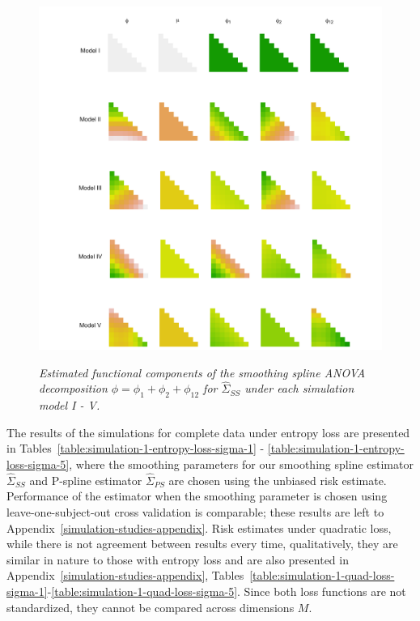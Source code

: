 \begin{figure}[H] 
\caption{\textit{Estimated functional components of the smoothing spline ANOVA decomposition $\phi = \phi_1 + \phi_2 + \phi_{12}$ for $\hat{\Sigma}_{SS}$ under each simulation model I - V.}}
  \includegraphics[width = \textwidth]{img/chapter-4/ssanova-estimate-lattice} \label{fig:ssanova-component-lattice}
\end{figure}

\bigskip
The results of the simulations for complete data under entropy loss are presented in Tables~\ref{table:simulation-1-entropy-loss-sigma-1} - \ref{table:simulation-1-entropy-loss-sigma-5}, where the smoothing parameters for our smoothing spline estimator $\hat{\Sigma}_{SS}$ and P-spline estimator $\hat{\Sigma}_{PS}$ are chosen using the unbiased risk estimate. Performance of the estimator when the smoothing parameter is chosen using leave-one-subject-out cross validation is comparable; these results are left to Appendix~\ref{simulation-studies-appendix}. Risk estimates under quadratic loss, while there is not agreement between results every time, qualitatively, they are similar in nature to those with entropy loss and are also presented in Appendix~\ref{simulation-studies-appendix}, Tables~\ref{table:simulation-1-quad-loss-sigma-1}-\ref{table:simulation-1-quad-loss-sigma-5}. Since both loss functions are not standardized, they cannot be compared across dimensions $M$.

